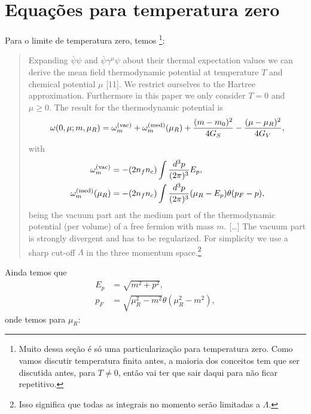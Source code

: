 \section{Equações para temperatura zero}

Para o limite de temperatura zero, temos \parencite{Buballa1996}\footnote{Muito dessa seção é só uma particularização para temperatura zero. Como vamos discutir temperatura finita antes, a maioria dos conceitos tem que ser discutida antes, para $T \neq 0$, então vai ter que sair daqui para não ficar repetitivo.}:
\begin{quote}
Expanding $\bar{\psi}\psi$ and $\bar{\psi}\gamma^\mu\psi$ about their thermal expectation values we can derive the mean field thermodynamic potential at temperature $T$ and chemical potential $\mu$ [11]. We restrict ourselves to the Hartree approximation. Furthermore in this paper we only consider $T=0$ and $\mu \geqslant 0$. The result for the thermodynamic potential is
\begin{equation}\label{Eq:Def_pot_termo}
	\omega(0,\mu; m, \mu_R) = \omega_m^{\rm{(vac)}} + \omega_m^{\rm{(med)}}(\mu_R) + \frac{(m - m_0)^2}{4G_S} - \frac{(\mu - \mu_R)^2}{4G_V},
\end{equation}
%
with
\begin{align}
	\omega_m^{\rm{(vac)}} &= - (2n_fn_c) \int \frac{d^3p}{(2\pi)^3} E_p, \label{Eq:Def_omega_vac}\\
	\omega_m^{\rm{(med)}}(\mu_R) &= - (2n_fn_c) \int \frac{d^3p}{(2\pi)^3}(\mu_R - E_p)\theta(p_F - p), \label{Eq:Def_omega_med}
\end{align}
%
being the vacuum part ant the medium part of the thermodynamic potential (per volume) of a free fermion with mass $m$. [\dots] The vacuum part is strongly divergent and has to be regularized. For simplicity we use a sharp cut-off $\Lambda$ in the three momentum space.\footnote{Isso significa que todas as integrais no momento serão limitadas a $\Lambda$.}
\end{quote}
%
Ainda temos que
\begin{align}
	E_p &= \sqrt{m^2+p^2}, \label{Eq:Def_E}\\
	p_F &= \sqrt{\mu_R^2 - m^2}\theta(\mu_R^2 - m^2), \label{Eq:Rel_pot_quim_renorm_mom_fermi}
\end{align}
%
onde temos para $\mu_R$:
